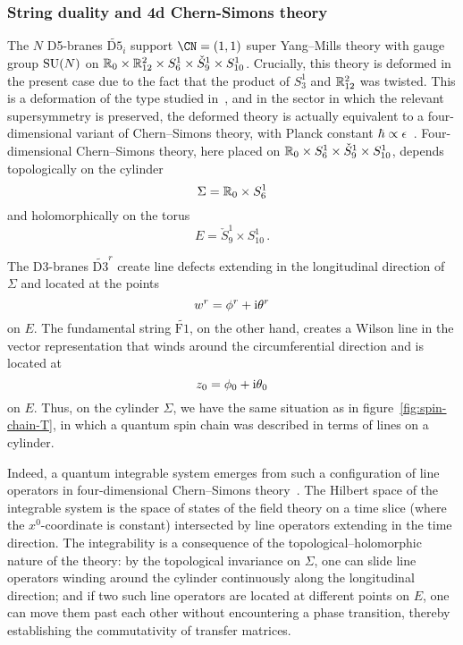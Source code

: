 \subsubsection{String duality and 4d Chern-Simons theory}

The $N$ D5-branes $\widetilde{\mathrm{D5}}_i$ support $\CN = (1,1)$
super Yang--Mills theory with gauge group $\mathrm{SU}(N)$ on
$\mathbb{R}_0 \times \mathbb{R}^2_{12} \times S^1_6 \times \check{S}^1_9 \times
S^1_{10}$.  Crucially, this theory is deformed in the present case due
to the fact that the product of $S^1_3$ and $\mathbb{R}^2_{12}$ was twisted.
This is a deformation of the type studied in~\cite{Yagi:2014toa}, and
in the sector in which the relevant supersymmetry is preserved, the
deformed theory is actually equivalent to a four-dimensional variant
of Chern--Simons theory, with Planck constant
$\hbar \propto \epsilon$~\cite{Costello:2018txb}.  Four-dimensional
Chern--Simons theory, here placed on
$\mathbb{R}_0 \times S^1_6 \times \check{S}^1_9 \times S^1_{10}$, depends
topologically on the cylinder
\begin{equation}
  \Sigma = \mathbb{R}_0 \times S^1_6
\end{equation}
and holomorphically on the torus
\begin{equation}
  E = \check{S}^1_9 \times S^1_{10} \,.
\end{equation}

The D3-branes $\widetilde{\mathrm{D3}}^r$ create line defects
extending in the longitudinal direction of $\Sigma$ and located at the
points
\begin{equation}
  w^r = \phi^r + \mathrm{i}\theta^r
\end{equation}
on $E$.  The fundamental string $\widetilde{\mathrm{F1}}$, on the
other hand, creates a Wilson line in the vector representation that
winds around the circumferential direction and is located at
\begin{equation}
  z_0 = \phi_0 + \mathrm{i}\theta_0
\end{equation}
on $E$.  Thus, on the cylinder $\Sigma$, we have the same situation as
in figure~\ref{fig:spin-chain-T}, in which a quantum spin chain was
described in terms of lines on a cylinder.

Indeed, a quantum integrable system emerges from such a configuration
of line operators in four-dimensional Chern--Simons
theory~\cite{Costello:2013zra}.  The Hilbert space of the integrable
system is the space of states of the field theory on a time slice
(where the $x^0$-coordinate is constant) intersected by line operators
extending in the time direction.  The integrability is a consequence
of the topological--holomorphic nature of the theory: by the
topological invariance on $\Sigma$, one can slide line operators
winding around the cylinder continuously along the longitudinal
direction; and if two such line operators are located at different
points on $E$, one can move them past each other without encountering
a phase transition, thereby establishing the commutativity of transfer
matrices.

